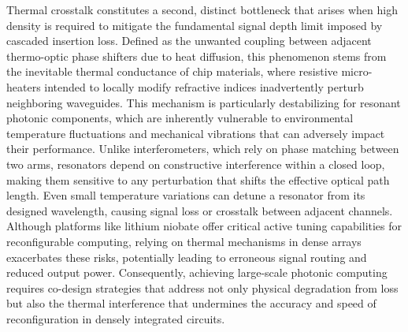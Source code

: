 Thermal crosstalk constitutes a second, distinct bottleneck that arises when high density is required to mitigate the fundamental signal depth limit imposed by cascaded insertion loss. Defined as the unwanted coupling between adjacent thermo-optic phase shifters due to heat diffusion, this phenomenon stems from the inevitable thermal conductance of chip materials, where resistive micro-heaters intended to locally modify refractive indices inadvertently perturb neighboring waveguides. \citep{doi_10_1109_access_2020_3013116_8fec1fb2} This mechanism is particularly destabilizing for resonant photonic components, which are inherently vulnerable to environmental temperature fluctuations and mechanical vibrations that can adversely impact their performance. \citep{doi_10_3390_photonics13030300_610aff5a} \citep{doi_10_1117_12_3079802_9c364d8e} Unlike interferometers, which rely on phase matching between two arms, resonators depend on constructive interference within a closed loop, making them sensitive to any perturbation that shifts the effective optical path length. Even small temperature variations can detune a resonator from its designed wavelength, causing signal loss or crosstalk between adjacent channels. Although platforms like lithium niobate offer critical active tuning capabilities for reconfigurable computing, relying on thermal mechanisms in dense arrays exacerbates these risks, potentially leading to erroneous signal routing and reduced output power. Consequently, achieving large-scale photonic computing requires co-design strategies that address not only physical degradation from loss but also the thermal interference that undermines the accuracy and speed of reconfiguration in densely integrated circuits. \citep{doi_10_1109_access_2020_3013116_8fec1fb2} \citep{doi_10_3390_nano14080697_c372a140} \citep{doi_10_1126_science_abj4396_40f36a09}

